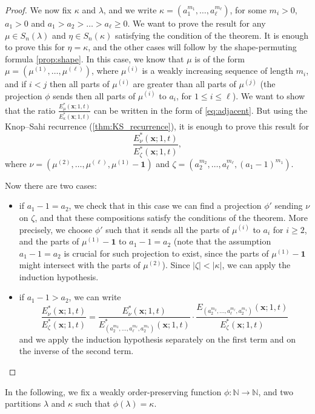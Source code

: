 \documentclass[12pt]{amsart}
\theoremstyle{definition}
\newcommand{\bfx}{\boldsymbol{x}}
\newcommand{\NN}{\mathbb N}
\begin{document}
\begin{appendices}
\begin{proof}
We now fix $\kappa$ and $\lambda$, and we write $\kappa=(a_1^{m_1},\dots,a_\ell^{m_\ell})$, for some $m_i>0$, $a_1>0$ and $a_1>a_2>\dots>a_\ell\geq 0$. We want to prove the result for any $\mu\in S_n(\lambda)$ and $\eta\in S_n(\kappa)$ satisfying the condition of the theorem. It is enough to prove this for $\eta=\kappa$, and the other cases will follow by the shape-permuting formula \cref{prop:shape}. In this case, we know that $\mu$ is of the form 
$\mu=(\mu^{(1)},\dots,\mu^{(\ell)})$, where $\mu^{(i)}$ is a weakly increasing sequence of length $m_i$, and if $i<j$ then all parts of $\mu^{(i)}$ are greater than all parts of $\mu^{(j)}$ (the projection $\phi$ sends then all parts of $\mu^{(i)}$ to $a_i$, for $1\leq i\leq \ell$).
We want to show that the ratio $\frac{E^*_\mu(\bfx;1,t)}{E^*_{\kappa}(\bfx;1,t)}$ can be written in the form of \cref{eq:adjacent}. But using the Knop–Sahi recurrence (\cref{thm:KS_recurrence}), it is enough to prove this result for
$$\frac{E^*_{\nu}(\bfx;1,t)}{E^*_{\zeta}(\bfx;1,t)},$$
where $\nu=(\mu^{(2)},\dots,\mu^{(\ell)},\mu^{(1)}-\mathbf{1})$ and $\zeta=(a_2^{m_2},\dots,a_\ell^{m_\ell},(a_1-1)^{m_1})$.

Now there are two cases:
\begin{itemize}
    \item if $a_1-1=a_2$, we check that in this case we can find a projection $\phi'$ sending $\nu$ on $\zeta$, and that these compositions satisfy the conditions of the theorem. 
    More precisely, we choose $\phi'$ such that it sends all the parts of $\mu^{(i)}$ to $a_i$ for $i\geq 2$, and the parts of $\mu^{(1)}-\mathbf{1}$ to $a_1-1=a_2$ (note that the assumption $a_1-1=a_2$ is crucial for such projection to exist, since the parts of $\mu^{(1)}-\mathbf{1}$ might intersect with the parts of $\mu^{(2)}$). 
    Since $|\zeta|<|\kappa|$,  we can apply the induction hypothesis.

    
    \item if $a_1-1>a_2$, we can write
    $$\frac{E^*_{\nu}(\bfx;1,t)}{E^*_{\zeta}(\bfx;1,t)}=
    \frac{E^*_{\nu}(\bfx;1,t)}{E^*_{(a_2^{m_2},\dots,a_\ell^{m_\ell},a_2^{m_1})}(\bfx;1,t)}\cdotp
    \frac{E_{(a_2^{m_2},\dots,a_\ell^{m_\ell},a_2^{m_1})}(\bfx;1,t)}{E^*_{\zeta}(\bfx;1,t)}$$
    and we apply the induction hypothesis separately on the first term and on the inverse of the second term.\qedhere
\end{itemize}
\end{proof} 


In the following, we fix a weakly order-preserving function $\phi:\NN\rightarrow\NN$, and two partitions $\lambda$ and $\kappa$ such that $\phi(\lambda)=\kappa$.



\end{appendices}
\end{document}
